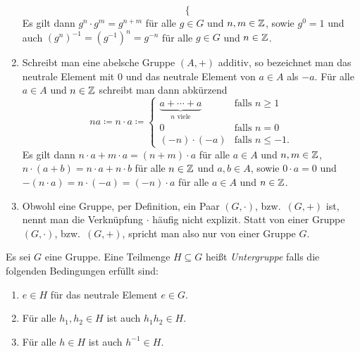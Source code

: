 \begin{bem}
\begin{enumerate}[leftmargin=*]
\[\begin{cases}
    \end{cases}
   \]
   Es gilt dann $g^n \cdot g^m = g^{n+m}$ für alle $g \in G$ und $n,m \in \mathbb{Z}$, sowie $g^0 = 1$ und auch  $(g^n)^{-1} = (g^{-1})^n = g^{-n}$ für alle $g \in G$ und $n \in \mathbb{Z}$.
  \item
   Schreibt man eine abelsche Gruppe $(A,+)$ additiv, so bezeichnet man das neutrale Element mit $0$ und das neutrale Element von $a \in A$ als $-a$. Für alle $a \in A$ und $n \in \mathbb{Z}$ schreibt man dann abkürzend
   \[
    n a \coloneqq
    n \cdot a \coloneqq
    \begin{cases}
     \underbrace{a + \dotsb + a}_{\text{$n$ viele}} & \text{falls $n \geq 1$} \\
     0                                              & \text{falls $n = 0$} \\
     (-n) \cdot (-a)                                & \text{falls $n \leq -1$}.
    \end{cases}
   \]
   Es gilt dann $n \cdot a + m \cdot a = (n+m) \cdot a$ für alle $a \in A$ und $n,m \in \mathbb{Z}$, $n \cdot (a+b) = n \cdot a + n \cdot b$ für alle $n \in \mathbb{Z}$ und $a,b \in A$, sowie $0 \cdot a = 0$ und $-(n \cdot a) = n \cdot (-a) = (-n) \cdot a$ für alle $a \in A$ und $n \in \mathbb{Z}$.
  \item
   Obwohl eine Gruppe, per Definition, ein Paar $(G, \cdot)$, bzw.\ $(G,+)$ ist, nennt man die Verknüpfung $\cdot$ häufig nicht explizit. Statt von einer Gruppe $(G, \cdot)$, bzw.\ $(G, +)$, spricht man also nur von einer Gruppe $G$.
 \end{enumerate}
\end{bem}


\begin{defi}
 Es sei $G$ eine Gruppe. Eine Teilmenge $H \subseteq G$ heißt \emph{Untergruppe} falls die folgenden Bedingungen erfüllt sind:
 \begin{enumerate}[label=\roman*)]
  \item
   $e \in H$ für das neutrale Element $e \in G$.
  \item
   Für alle $h_1, h_2 \in H$ ist auch $h_1 h_2 \in H$.
  \item
   Für alle $h \in H$ ist auch $h^{-1} \in H$.
 \end{enumerate}
\end{defi}


